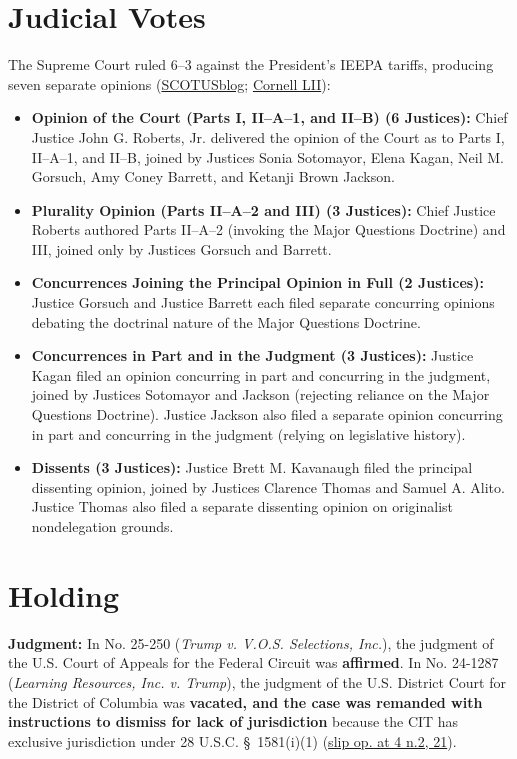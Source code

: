 \documentclass[12pt]{article}
\begin{document}
\section{Judicial Votes}
The Supreme Court ruled 6--3 against the President's IEEPA tariffs, producing seven separate opinions (\href{https://www.scotusblog.com/cases/learning-resources-inc-v-trump/}{SCOTUSblog}; \href{https://www.law.cornell.edu/supremecourt/text/24-1287}{Cornell LII}):
\begin{itemize}
\item \textbf{Opinion of the Court (Parts I, II--A--1, and II--B) (6 Justices):} Chief Justice John G. Roberts, Jr. delivered the opinion of the Court as to Parts I, II--A--1, and II--B, joined by Justices Sonia Sotomayor, Elena Kagan, Neil M. Gorsuch, Amy Coney Barrett, and Ketanji Brown Jackson.
\item \textbf{Plurality Opinion (Parts II--A--2 and III) (3 Justices):} Chief Justice Roberts authored Parts II--A--2 (invoking the Major Questions Doctrine) and III, joined only by Justices Gorsuch and Barrett.
\item \textbf{Concurrences Joining the Principal Opinion in Full (2 Justices):} Justice Gorsuch and Justice Barrett each filed separate concurring opinions debating the doctrinal nature of the Major Questions Doctrine.
\item \textbf{Concurrences in Part and in the Judgment (3 Justices):} Justice Kagan filed an opinion concurring in part and concurring in the judgment, joined by Justices Sotomayor and Jackson (rejecting reliance on the Major Questions Doctrine). Justice Jackson also filed a separate opinion concurring in part and concurring in the judgment (relying on legislative history).
\item \textbf{Dissents (3 Justices):} Justice Brett M. Kavanaugh filed the principal dissenting opinion, joined by Justices Clarence Thomas and Samuel A. Alito. Justice Thomas also filed a separate dissenting opinion on originalist nondelegation grounds.
\end{itemize}

\section{Holding}
\textbf{Judgment:} In No. 25-250 (\textit{Trump v. V.O.S. Selections, Inc.}), the judgment of the U.S. Court of Appeals for the Federal Circuit was \textbf{affirmed}. In No. 24-1287 (\textit{Learning Resources, Inc. v. Trump}), the judgment of the U.S. District Court for the District of Columbia was \textbf{vacated, and the case was remanded with instructions to dismiss for lack of jurisdiction} because the CIT has exclusive jurisdiction under 28 U.S.C. \S~1581(i)(1) (\href{https://www.law.cornell.edu/supremecourt/text/24-1287}{slip op. at 4 n.2, 21}).
\end{document}
